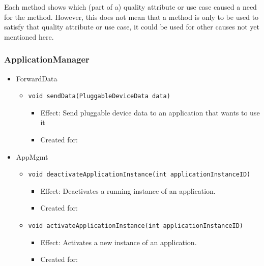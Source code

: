     \noindent Each method shows which (part of a) quality attribute or use case caused
    a need for the method. However, this does not mean that a method is
    only to be used to satisfy that quality  attribute or use case, it could
    be used for other causes not yet mentioned here.

    \subsubsection{ApplicationManager}
        \begin{itemize}
            \item ForwardData
            \begin{itemize}
                \item \texttt{void sendData(PluggableDeviceData data)}
                \begin{itemize}
                    \item Effect: Send pluggable device data to an application that wants to use it
                    \item Created for:
                \end{itemize}
            \end{itemize}

            \item AppMgmt
            \begin{itemize}
                \item \texttt{void deactivateApplicationInstance(int applicationInstanceID)}
                \begin{itemize}
                    \item Effect: Deactivates a running instance of an application.
                    \item Created for:
                \end{itemize}
                \item \texttt{void activateApplicationInstance(int applicationInstanceID)}
                \begin{itemize}
                    \item Effect: Activates a new instance of an application.
                    \item Created for:
                \end{itemize}
            \end{itemize}
        \end{itemize}

